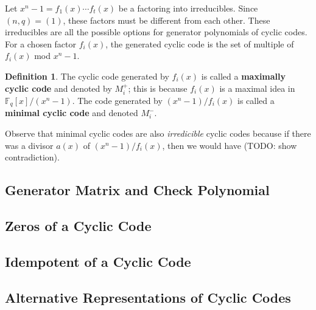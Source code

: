 \documentclass{article}
\newcommand{\F}{\mathbb{F}}
\renewcommand{\=}{\equiv}
\theoremstyle{plain}
\theoremstyle{definition}
\newtheorem{defn}{Definition}[subsection]
\newcommand{\TODO}[1]{(TODO: #1)}
\begin{document}
Let $x^n - 1 = f_1(x) \cdots f_t(x)$ be a factoring into irreducibles.
Since $(n, q) = (1)$, these factors must be different from each other.
These irreducibles are all the possible options for generator polynomials of cyclic codes.
For a chosen factor $f_i(x)$, the generated cyclic code is the set of multiple of $f_i(x)$ mod $x^n - 1$.

\begin{defn}
  \label{def:cyclic-generator}
  The cyclic code generated by $f_i(x)$ is called a \textbf{maximally cyclic code} and denoted by $M_i^+$; this is because $f_i(x)$ is a maximal idea in $\F_q[x]/(x^n-1)$.
  The code generated by $(x^n-1)/f_i(x)$ is called a \textbf{minimal cyclic code} and denoted $M_i^-$.
\end{defn}

Observe that minimal cyclic codes are also \textit{irredicible} cyclic codes because if there was a divisor $a(x)$ of $(x^n-1)/f_i(x)$, then we would have \TODO{show contradiction}.

\subsection{Generator Matrix and Check Polynomial}

\subsection{Zeros of a Cyclic Code}

\subsection{Idempotent of a Cyclic Code}

\subsection{Alternative Representations of Cyclic Codes}
\end{document}
